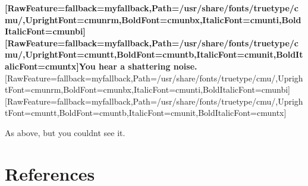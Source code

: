 {\bfseries \allowbreak{}\setmainfont{cmunbx.ttf}[RawFeature={fallback=myfallback},Path=/usr/share/fonts/truetype/cmu/,UprightFont=cmunrm,BoldFont=cmunbx,ItalicFont=cmunti,BoldItalicFont=cmunbi]\setmonofont{cmunbx.ttf}[RawFeature={fallback=myfallback},Path=/usr/share/fonts/truetype/cmu/,UprightFont=cmuntt,BoldFont=cmuntb,ItalicFont=cmunit,BoldItalicFont=cmuntx]\bfseries You hear a shattering noise.}\allowbreak{}\setmainfont{cmunrm.ttf}[RawFeature={fallback=myfallback},Path=/usr/share/fonts/truetype/cmu/,UprightFont=cmunrm,BoldFont=cmunbx,ItalicFont=cmunti,BoldItalicFont=cmunbi]\setmonofont{cmunrm.ttf}[RawFeature={fallback=myfallback},Path=/usr/share/fonts/truetype/cmu/,UprightFont=cmuntt,BoldFont=cmuntb,ItalicFont=cmunit,BoldItalicFont=cmuntx]

\begin{myquote}
\item{}As above, but you couldn\textquotesingle{}t see it.
\end{myquote}

\section{References}
\label{16}

